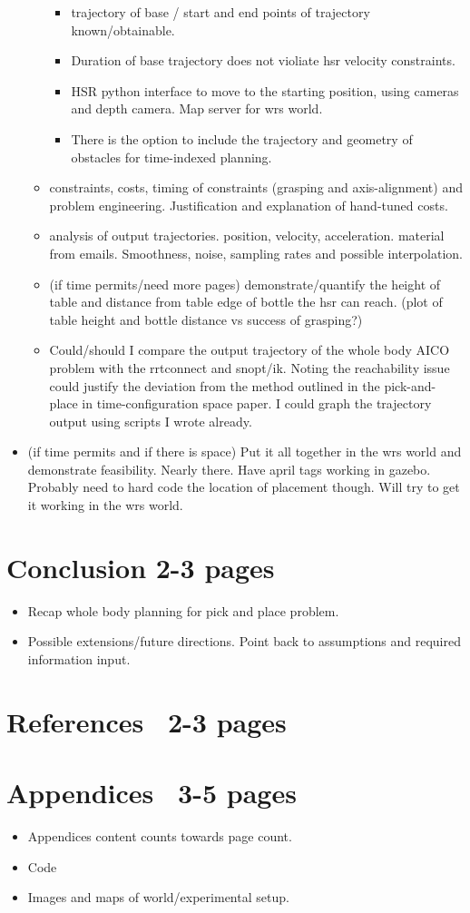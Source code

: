\documentclass[12pt]{article}
\begin{document}
\begin{itemize}
\begin{itemize}
\begin{itemize}
                \item trajectory of base / start and end points of trajectory known/obtainable.
                \item Duration of base trajectory does not violiate hsr velocity constraints.
                \item HSR python interface to move to the starting position, using cameras and depth camera. Map server for wrs world.
                \item There is the option to include the trajectory and geometry of obstacles for time-indexed planning.
            \end{itemize}
            \item constraints, costs, timing of constraints (grasping and axis-alignment) and problem engineering. Justification and explanation of hand-tuned costs.
            \item analysis of output trajectories. position, velocity, acceleration. material from emails. Smoothness, noise, sampling rates and possible interpolation.
            \item (if time permits/need more pages) demonstrate/quantify the height of table and distance from table edge of bottle the hsr can reach. (plot of table height and bottle distance vs success of grasping?)
            \item Could/should I compare the output trajectory of the whole body AICO problem with the rrtconnect and snopt/ik. Noting the reachability issue could justify the deviation from the method outlined in the pick-and-place in time-configuration space paper. I could graph the trajectory output using scripts I wrote already.
        \end{itemize}
        \item (if time permits and if there is space) Put it all together in the wrs world and demonstrate feasibility. Nearly there. Have april tags working in gazebo. Probably need to hard code the location of placement though. Will try to get it working in the wrs world.
    \end{itemize}
\section{Conclusion 2-3 pages}
\begin{itemize}
    \item Recap whole body planning for pick and place problem.
    \item Possible extensions/future directions. Point back to assumptions and required information input.
\end{itemize}
\section{References ~2-3 pages}
\section{Appendices ~3-5 pages}
\begin{itemize}
    \item Appendices content counts towards page count.
    \item Code
    \item Images and maps of world/experimental setup.
\end{itemize}
\end{document}

